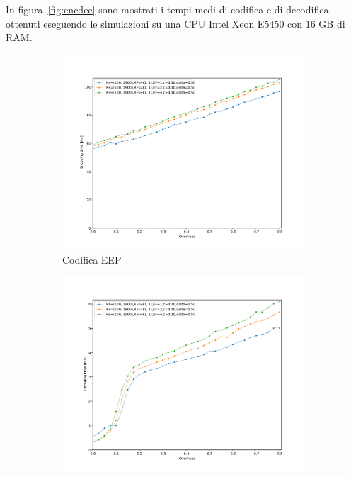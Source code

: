 \documentclass[italian, a4paper, 12pt]{article}
\begin{document}
In figura~\ref{fig:encdec} sono mostrati i tempi medi di codifica e di
decodifica ottenuti eseguendo le simulazioni su una CPU Intel Xeon
E5450 con 16 GB di RAM.
%
\begin{figure}[htb]
  \centering
  \begin{subfigure}{0.5\textwidth}
    \centering
    \includegraphics[width=\textwidth]{plot_enc_time_eep}
    \caption{Codifica EEP}
    \label{fig:enctime_eep}
  \end{subfigure}%
  \begin{subfigure}{0.5\textwidth}
    \centering
    \includegraphics[width=\textwidth]{plot_dec_time_eep}

\end{subfigure}
\end{figure}
\end{document}
